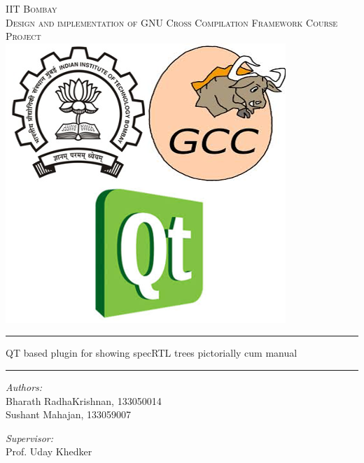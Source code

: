 \begin{titlepage}
\begin{center}

\textsc{\LARGE IIT Bombay}\\[1cm]

\textsc{\Large Design and implementation of GNU Cross Compilation Framework Course Project}\\[0.5cm]
\vspace{1cm}
\includegraphics[scale=0.5]{logo}
\vspace{1cm}

\hrule
\vspace{3cm}
\huge{QT based plugin for showing specRTL trees pictorially cum manual}
\vspace{3cm}
\hrule

\vfill
\begin{minipage}{0.4\textwidth}
\begin{flushleft} \large
\emph{Authors:}\\
Bharath RadhaKrishnan, 133050014 \\
Sushant Mahajan, 133059007
\end{flushleft}
\end{minipage}
\begin{minipage}{0.4\textwidth}
\begin{flushright} \large
\emph{Supervisor:} \\
Prof. Uday Khedker
\end{flushright}
\end{minipage}

\end{center}
\end{titlepage}